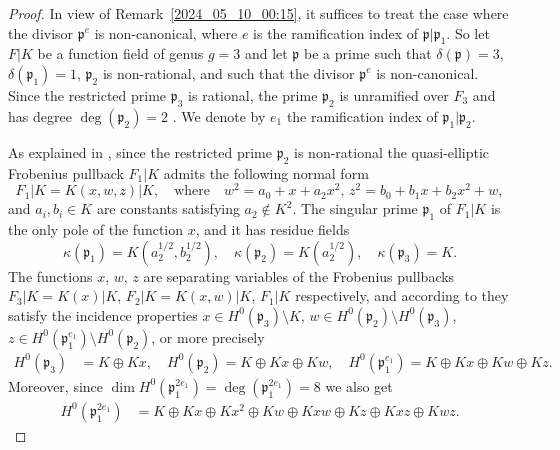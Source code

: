 \documentclass[12pt,reqno]{amsart}
\newcommand{\toda}[2][]{\todo[color=blue!30, #1]{#2}} %
\theoremstyle{definition}
\newcommand{\pp}{\mathfrak{p}}
\newcommand{\de}{\delta}
\newcommand{\ka}{\kappa}
\begin{document}
\begin{proof}
In view of Remark~\ref{2024_05_10_00:15}, it suffices to treat the case where the divisor $\pp^e$ is non-canonical, where $e$ is the ramification index of $\pp|\pp_1$.
So let $F|K$ be a function field of genus $g = 3$ and let $\pp$ be a prime such that $\de(\pp) = 3$, $\de(\pp_1) = 1$, $\pp_2$ is non-rational, and such that the divisor $\pp^e$ is non-canonical. 
Since the restricted prime $\pp_3$ is rational, the prime $\pp_2$ is unramified over $F_3$ and has degree $\deg(\pp_2)=2$ .
We denote by $e_1$ the ramification index of $\pp_1|\pp_2$.

As explained in \cite[Remark~2.2]{HiSt23}, since the restricted prime $\pp_2$ is non-rational
the quasi-elliptic Frobenius pullback $F_1|K$ admits the following normal form
\begin{equation*}
    F_1|K=K(x,w,z)|K, \quad\text{where} \quad w^2 = a_0 + x + a_2 x^2, \, z^2 = b_0 + b_1 x +b_2 x^2 + w,
\end{equation*}
and $a_i,b_i \in K$ are constants satisfying $a_2\notin K^2$. %
The singular prime $\pp_1$ of $F_1|K$ is the only pole of the function $x$, and it has residue fields
\begin{equation}\label{2023_12_18_15:00}
    \ka(\pp_1)=K(a_2^{1/2},b_2^{1/2}), \quad \ka(\pp_2)=K(a_2^{1/2}), \quad \ka(\pp_3)=K.
\end{equation}
The functions $x$, $w$, $z$ are separating variables of the Frobenius pullbacks $F_3|K=K(x)|K$, $F_2|K=K(x,w)|K$, $F_1|K$ respectively,
and according to \cite[Remark~2.3]{HiSt23} they satisfy the incidence properties 
$x\in H^0(\pp_3) \setminus K$, 
$w\in H^0(\pp_2) \setminus H^0(\pp_3)$, 
$z\in H^0(\pp_1^{e_1}) \setminus H^0(\pp_2)$,
or more precisely
\begin{align*}
    H^0(\pp_3) &= K \oplus Kx, \quad
    H^0(\pp_2) = K \oplus Kx \oplus K w, \quad
    H^0(\pp_1^{e_1}) = K \oplus Kx \oplus K w \oplus K z.
\end{align*}
Moreover, since $\dim H^0(\pp_1^{2 e_1}) = \deg(\pp_1^{2 e_1}) = 8$ we also get
\begin{align}\label{2023_06_29_18:55}
    H^0(\pp_1^{2 e_1}) &= K \oplus Kx \oplus Kx^2 \oplus K w \oplus K x w \oplus K z \oplus K x z \oplus K w z.
\end{align}


\end{proof}
\end{document}
